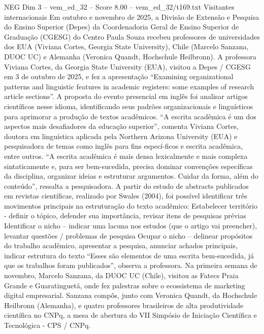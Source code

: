 \begin{textsample}{NEG Dim 3 – vem\_ed\_32 – Score 8.00 – vem\_ed\_32/t169.txt}  \label{ex:f3_neg_150}
Visitantes internacionais Em outubro e novembro de 2025, a Divisão de Extensão e Pesquisa do Ensino Superior (Depes) da Coordenadoria Geral de Ensino Superior de Graduação (CGESG) do Centro Paula Souza recebeu professores de universidades dos EUA (Viviana Cortes, Georgia State University), Chile (Marcelo Sanzana, DUOC UC) e Alemanha (Veronica Quandt, Hochschule Heilbronn).
A professora Viviana Cortes, da Georgia State University (EUA), visitou a Depes / CGESG em 3 de outubro de 2025, e fez a apresentação “Examining organizational patterns and linguistic features in academic registers: some examples of research article sections”.
A proposta do evento presencial em inglês foi analisar artigos científicos nesse idioma, identificando seus padrões organizacionais e linguísticos para aprimorar a produção de textos acadêmicos. “A escrita acadêmica é um dos aspectos mais desafiadores da educação superior”, comenta Viviana Cortes, doutora em linguística aplicada pela Northern Arizona University (EUA) e pesquisadora de temas como inglês para fins especí-ficos e escrita acadêmica, entre outros. “A escrita acadêmica é mais densa lexicalmente e mais complexa sintaticamente e, para ser bem-sucedida, precisa dominar convenções específicas da disciplina, organizar ideias e estruturar argumentos.
Cuidar da forma, além do conteúdo”, ressalta a pesquisadora.
A partir do estudo de abstracts publicados em revistas científicas, realizado por Swales (2004), foi possível identificar três movimentos principais na estruturação do texto acadêmico: Estabelecer território - definir o tópico, defender sua importância, revisar itens de pesquisas prévias Identificar o nicho – indicar uma lacuna nos estudos (que o artigo vai preencher), levantar questões / problemas de pesquisa Ocupar o nicho – delinear propósitos do trabalho acadêmico, apresentar a pesquisa, anunciar achados principais, indicar estrutura do texto “Esses são elementos de uma escrita bem-sucedida, já que os trabalhos foram publicados”, observa a professora.
Na primeira semana de novembro, Marcelo Sanzana, da DUOC UC (Chile), visitou as Fatecs Praia Grande e Guaratinguetá, onde fez palestras sobre o ecossistema de marketing digital empresarial.
Sanzana compôs, junto com Veronica Quandt, da Hochschule Heilbronn (Alemanha), e quatro professores brasileiros de alta produtividade científica no CNPq, a mesa de abertura do VII Simpósio de Iniciação Científica e Tecnológica - CPS / CNPq.

\end{textsample}
